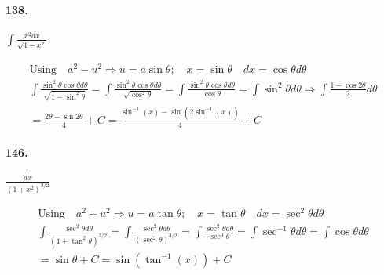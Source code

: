     \paragraph*{138.}
    $\int \frac{x^{2}dx}{\sqrt{1-x^2}}$
    \\
    \begin{mdframed}
        \begin{equation*}
            \begin{gathered}
                \text{Using} \quad a^2 - u^2 \Rightarrow    
                u = a\sin\theta; \quad x = \sin\theta 
                \quad dx = \cos\theta d \theta                  \\
                \int \frac{\sin^2\theta\cos\theta d \theta}
                {\sqrt{1 - \sin^2\theta}}
                = \int \frac{\sin^2\theta\cos\theta d \theta}
                {\sqrt{\cos^2\theta}} 
                = \int \frac{\sin^2\theta\cos\theta d \theta}
                {\cos\theta}
                = \int \sin^2\theta d \theta \Rightarrow
                \int \frac{1-\cos 2\theta}{2}d\theta            \\
                = \frac{2\theta - \sin 2\theta}{4} + C 
                = \boxed{\frac{\sin^{-1}(x) - \sin(2\sin^{-1}(x))}{4} + C}
            \end{gathered}
        \end{equation*}
    \end{mdframed}

    \paragraph*{146.}
    $\frac{dx}{(1+x^2)^{3/2}}$
    \\
    \begin{mdframed}
        \begin{equation*}
            \begin{gathered}
                \text{Using} \quad a^2 + u^2 \Rightarrow
                u = a\tan\theta; \quad x = \tan\theta \quad dx 
                = \sec^2\theta d \theta                     \\
                \int \frac{\sec^2\theta d \theta}
                {(1+\tan^2\theta)^{3/2}}
                = \int \frac{\sec^2\theta d \theta} 
                {(\sec^2\theta)^{3/2}}
                = \int \frac{\sec^2\theta d \theta}
                {\sec^3\theta}
                = \int \sec^{-1}\theta d \theta
                = \int \cos\theta d \theta                   \\
                = \sin\theta + C = \boxed{\sin(\tan^{-1}(x)) + C}      
            \end{gathered}
        \end{equation*}
    \end{mdframed}
